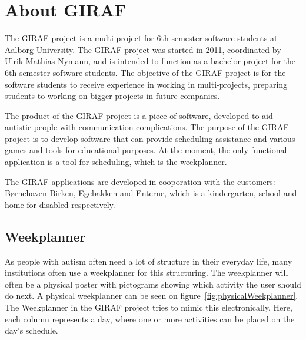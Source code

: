 \section{About GIRAF}

The GIRAF project is a multi-project for 6th semester software students at Aalborg University. 
The GIRAF project was started in 2011, coordinated by Ulrik Mathias Nymann, and is intended to function as a bachelor project for the 6th semester software students. 
The objective of the GIRAF project is for the software students to receive experience in working in multi-projects, preparing students to working on bigger projects in future companies.


The product of the GIRAF project is a piece of software, developed to aid autistic people with communication complications. 
The purpose of the GIRAF project is to develop software that can provide scheduling assistance and various games and tools for educational purposes.
At the moment, the only functional application is a tool for scheduling, which is the weekplanner. 

The GIRAF applications are developed in cooporation with the customers: Børnehaven Birken, Egebakken and Enterne, which is a kindergarten, school and home for disabled respectively. 

\subsection{Weekplanner}
As people with autism often need a lot of structure in their everyday life, many institutions often use a weekplanner for this structuring. The weekplanner will often be a physical poster with pictograms showing which activity the user should do next. A physical weekplanner can be seen on figure~\ref{fig:physicalWeekplanner}. The Weekplanner in the GIRAF project tries to mimic this electronically.
Here, each column represents a day, where one or more activities can be placed on the day's schedule. 

